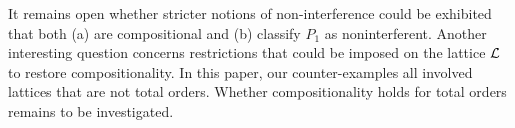 \documentclass[preprint,5p,twocolumn]{elsarticle}
\begin{document}
It remains open whether stricter notions of non-interference could be exhibited that both (a) are compositional and (b) classify $P_1$ as noninterferent. Another interesting question concerns restrictions  that could be imposed on the lattice $\mathcal{L}$ to restore compositionality. In this paper, our counter-examples all involved lattices that are not total orders. Whether compositionality holds for total orders remains to be investigated.

  
 





\end{document}
